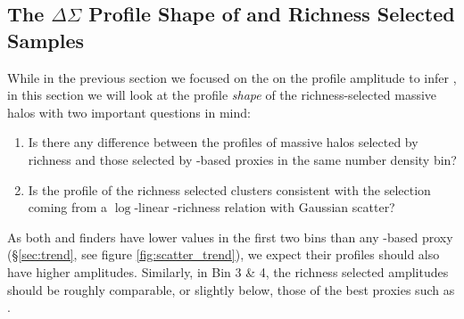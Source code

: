 \documentclass[fleqn,usenatbib,useAMS,english]{mnras}
\begin{document}
\subsection{The $\Delta\Sigma$ Profile Shape of \mstar{} and Richness Selected Samples}
    \label{sec:mstar_vs_richness}

    While in the previous section we focused on the on the \dsigma{} profile amplitude
    to infer \sigmvir{}, in this section we will look at the profile {\em shape} of the
    richness-selected massive halos with two important questions in mind:

    \begin{enumerate}

        \item Is there any difference between the \dsigma{} profiles of massive halos selected by
            richness and those selected by \mstar{}-based proxies in the same number density bin?

        \item Is the \dsigma{} profile of the richness selected clusters consistent with the
            selection coming from a $\log$-linear \mvir{}-richness relation with Gaussian scatter?

    \end{enumerate}

    As both \redm{} and \camira{} finders have lower \sigmvir{} values in the first two
    \topn{} bins than any \mstar{}-based proxy (\S \ref{sec:trend}, see figure
    \ref{fig:scatter_trend}), we expect their \dsigma{} profiles should also have higher
    amplitudes.
    Similarly, in Bin 3 \& 4, the richness selected \dsigma{} amplitudes should be roughly
    comparable, or slightly below, those of the best \mstar{} proxies such as .
\end{document}

